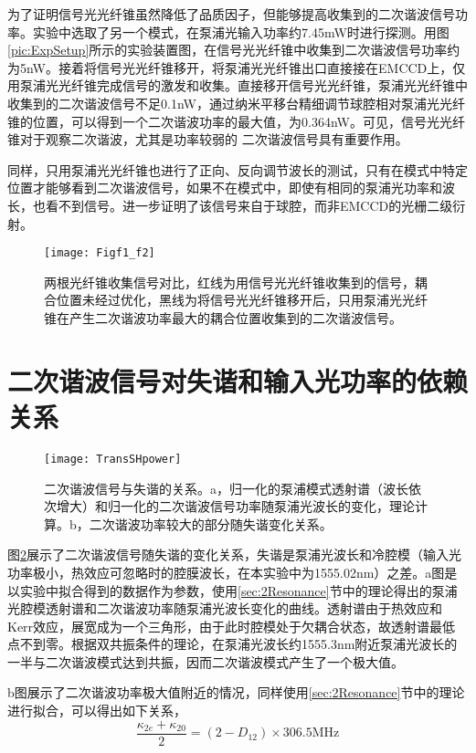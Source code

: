 为了证明信号光光纤锥虽然降低了品质因子，但能够提高收集到的二次谐波信号功率。实验中选取了另一个模式，在泵浦光输入功率约7.45mW时进行探测。用图\ref{pic:ExpSetup}所示的实验装置图，在信号光光纤锥中收集到二次谐波信号功率约为5nW。接着将信号光光纤锥移开，将泵浦光光纤锥出口直接接在EMCCD上，仅用泵浦光光纤锥完成信号的激发和收集。直接移开信号光光纤锥，泵浦光光纤锥中收集到的二次谐波信号不足0.1nW，通过纳米平移台精细调节球腔相对泵浦光光纤锥的位置，可以得到一个二次谐波功率的最大值，为0.364nW。可见，信号光光纤锥对于观察二次谐波，尤其是功率较弱的 二次谐波信号具有重要作用。

同样，只用泵浦光光纤锥也进行了正向、反向调节波长的测试，只有在模式中特定位置才能够看到二次谐波信号，如果不在模式中，即使有相同的泵浦光功率和波长，也看不到信号。进一步证明了该信号来自于球腔，而非EMCCD的光栅二级衍射。

\begin{figure}
\centering
\texttt{[image: Figf1\_f2]}
\caption{两根光纤锥收集信号对比，红线为用信号光光纤锥收集到的信号，耦合位置未经过优化，黑线为将信号光光纤锥移开后，只用泵浦光光纤锥在产生二次谐波功率最大的耦合位置收集到的二次谐波信号。}
\label{pic:Figf1_f2}
\end{figure}

\section{二次谐波信号对失谐和输入光功率的依赖关系}


\begin{figure}
\centering
\texttt{[image: TransSHpower]}
\caption{二次谐波信号与失谐的关系。a，归一化的泵浦模式透射谱（波长依次增大）和归一化的二次谐波信号功率随泵浦光波长的变化，理论计算。b，二次谐波功率较大的部分随失谐变化关系。}
\label{pic:TransSHpower}
\end{figure}

图\ref{pic:TransSHpower}展示了二次谐波信号随失谐的变化关系，失谐是泵浦光波长和冷腔模（输入光功率极小，热效应可忽略时的腔膜波长，在本实验中为1555.02nm）之差。a图是以实验中拟合得到的数据作为参数，使用\ref{sec:2Resonance}节中的理论得出的泵浦光腔模透射谱和二次谐波功率随泵浦光波长变化的曲线。透射谱由于热效应和Kerr效应，展宽成为一个三角形\cite{carmon2004dynamical}，由于此时腔模处于欠耦合状态，故透射谱最低点不到零。根据双共振条件的理论，在泵浦光波长约1555.3nm附近泵浦光波长的一半与二次谐波模式达到共振，因而二次谐波模式产生了一个极大值。

b图展示了二次谐波功率极大值附近的情况，同样使用\ref{sec:2Resonance}节中的理论进行拟合，可以得出如下关系，
\begin{equation}
\frac{\kappa_{2e}+\kappa_{20}}{2} = (2-D_{12})\times 306.5\mathrm{ MHz}
\end{equation}

